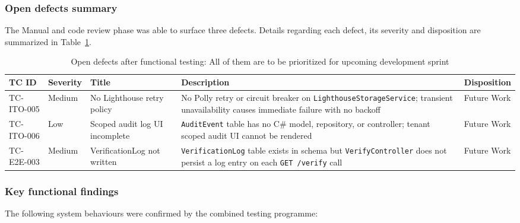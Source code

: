 \subsubsection{Open defects summary}

The Manual and code review phase was able to surface three defects.
Details regarding each defect, its severity and disposition are summarized in Table~\ref{tab:func-defects}.

\begin{table}[H]
  \vspace{2ex}
  \centering
  \footnotesize
  {%
  \setlength{\tabcolsep}{5pt}
  \renewcommand{\arraystretch}{1.3}
  \begin{tabular}{|>{\centering\arraybackslash}p{}|
                  >{\centering\arraybackslash}p{}|
                  >{\raggedright\arraybackslash}p{}|
                  >{\raggedright\arraybackslash}p{}|
                  >{\centering\arraybackslash}p{}|}
    \hline
    \textbf{TC ID} & \textbf{Severity} & \textbf{Title} & \textbf{Description} & \textbf{Disposition} \\
    \hline\hline
    TC-ITO-005 & Medium & No Lighthouse retry policy & No Polly retry or circuit breaker on \texttt{LighthouseStorageService}; transient unavailability causes immediate failure with no backoff & Future Work \\
    \hline
    TC-ITO-006 & Low & Scoped audit log UI incomplete & \texttt{AuditEvent} table has no C\# model, repository, or controller; tenant scoped audit UI cannot be rendered & Future Work \\
    \hline
    TC-E2E-003 & Medium & VerificationLog not written & \texttt{VerificationLog} table exists in schema but \texttt{VerifyController} does not persist a log entry on each \texttt{GET /verify} call & Future Work \\
    \hline
  \end{tabular}
  }%
  \vspace{2ex}
  \captionsetup{type=table}
  \caption{Open defects after functional testing: All of them are to be prioritized for upcoming development sprint}
  \label{tab:func-defects}
\end{table}

\subsubsection{Key functional findings}

The following system behaviours were confirmed by the combined testing programme:

